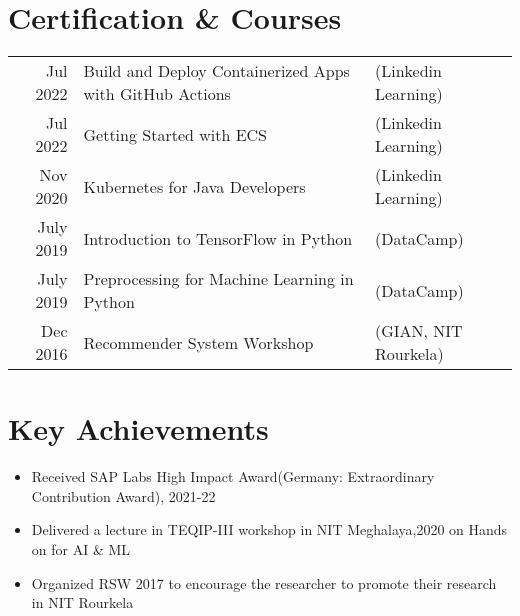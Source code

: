 \documentclass[a4paper,12pt]{article}
\begin{document}
\section{Certification \& Courses}
\begin{tabular}{rll}
 Jul 2022  & Build and Deploy Containerized Apps with GitHub Actions & (Linkedin Learning)\\
 Jul 2022  & Getting Started with ECS & (Linkedin Learning)\\
 Nov 2020  & Kubernetes for Java Developers & (Linkedin Learning)\\
 July 2019 & Introduction to TensorFlow in Python & (DataCamp)\\
 July 2019 & Preprocessing for Machine Learning in Python & (DataCamp)\\
 Dec 2016  & Recommender System Workshop & (GIAN, NIT Rourkela)
\end{tabular}

\section{Key Achievements}
  \begin{itemize}[nosep,after=\strut, leftmargin=1em, itemsep=3pt]
    \item Received SAP Labs High Impact Award(Germany: Extraordinary Contribution Award), 2021-22
    \item Delivered a lecture in TEQIP-III workshop in NIT Meghalaya,2020 on Hands on for AI \& ML 
    \item Organized RSW 2017 to encourage the researcher to promote their research in NIT Rourkela
  \end{itemize}

\vfill
\end{document}
